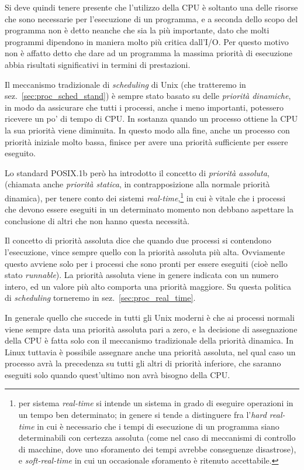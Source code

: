 Si deve quindi tenere presente che l'utilizzo della CPU è soltanto una delle
risorse che sono necessarie per l'esecuzione di un programma, e a seconda
dello scopo del programma non è detto neanche che sia la più importante, dato
che molti programmi dipendono in maniera molto più critica dall'I/O. Per
questo motivo non è affatto detto che dare ad un programma la massima priorità
di esecuzione abbia risultati significativi in termini di prestazioni.

Il meccanismo tradizionale di \textit{scheduling} di Unix (che tratteremo in
sez.~\ref{sec:proc_sched_stand}) è sempre stato basato su delle
\textsl{priorità dinamiche}, in modo da assicurare che tutti i processi, anche
i meno importanti, potessero ricevere un po' di tempo di CPU. In sostanza
quando un processo ottiene la CPU la sua priorità viene diminuita. In questo
modo alla fine, anche un processo con priorità iniziale molto bassa, finisce
per avere una priorità sufficiente per essere eseguito.

Lo standard POSIX.1b però ha introdotto il concetto di \textsl{priorità
  assoluta}, (chiamata anche \textsl{priorità statica}, in contrapposizione
alla normale priorità dinamica), per tenere conto dei sistemi
\textit{real-time},\footnote{per sistema \textit{real-time} si intende un
  sistema in grado di eseguire operazioni in un tempo ben determinato; in
  genere si tende a distinguere fra l'\textit{hard real-time} in cui è
  necessario che i tempi di esecuzione di un programma siano determinabili con
  certezza assoluta (come nel caso di meccanismi di controllo di macchine,
  dove uno sforamento dei tempi avrebbe conseguenze disastrose), e
  \textit{soft-real-time} in cui un occasionale sforamento è ritenuto
  accettabile.} in cui è vitale che i processi che devono essere eseguiti in
un determinato momento non debbano aspettare la conclusione di altri che non
hanno questa necessità.

Il concetto di priorità assoluta dice che quando due processi si contendono
l'esecuzione, vince sempre quello con la priorità assoluta più alta.
Ovviamente questo avviene solo per i processi che sono pronti per essere
eseguiti (cioè nello stato \textit{runnable}).  La priorità assoluta viene in
genere indicata con un numero intero, ed un valore più alto comporta una
priorità maggiore. Su questa politica di \textit{scheduling} torneremo in
sez.~\ref{sec:proc_real_time}.

In generale quello che succede in tutti gli Unix moderni è che ai processi
normali viene sempre data una priorità assoluta pari a zero, e la decisione di
assegnazione della CPU è fatta solo con il meccanismo tradizionale della
priorità dinamica. In Linux tuttavia è possibile assegnare anche una priorità
assoluta, nel qual caso un processo avrà la precedenza su tutti gli altri di
priorità inferiore, che saranno eseguiti solo quando quest'ultimo non avrà
bisogno della CPU.


